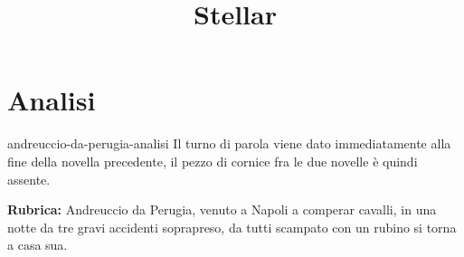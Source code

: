 \documentclass[preview]{standalone}
\begin{document}
\title{Stellar}
\genpage

\section{Analisi}

\begin{snippet}{andreuccio-da-perugia-analisi}
    Il turno di parola viene dato immediatamente alla fine della novella precedente,
    il pezzo di cornice fra le due novelle è quindi assente. 
    
    \textbf{Rubrica:} Andreuccio da Perugia, venuto a Napoli a comperar cavalli, in una notte
    da tre gravi accidenti soprapreso, da tutti scampato con un rubino si torna a
    casa sua.
    
    
    

\end{snippet}
\end{document}
